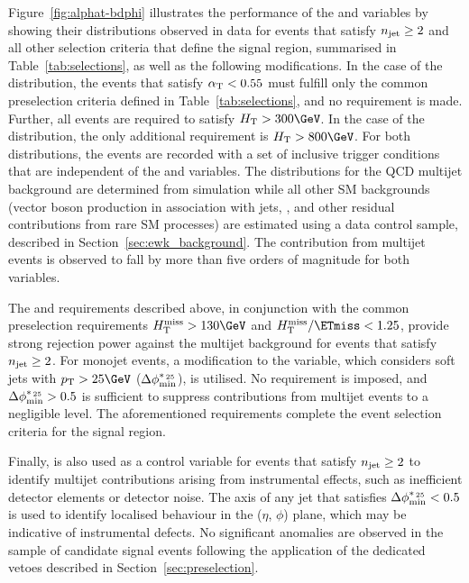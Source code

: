Figure~\ref{fig:alphat-bdphi} illustrates the performance of the
\alphat and \bdphi variables by showing their distributions observed
in data for events that satisfy $n_{\text{jet}} \geq 2$ and all other selection
criteria that define the signal region, summarised in
Table~\ref{tab:selections}, as well as the following modifications.
In the case of the \alphat distribution, the events that satisfy
$\alpha_{\text{T}} < 0.55$ must fulfill only the common preselection criteria
defined in Table~\ref{tab:selections}, and no \HTmiss requirement is
made. Further, all events are required to satisfy $\scalht >
300\GeV$. In the case of the \bdphi distribution, the only additional
requirement is $\scalht > 800\GeV$. For both distributions, the events
are recorded with a set of inclusive trigger conditions that are
independent of the \alphat and \bdphi variables. The distributions for
the QCD multijet background are determined from simulation while all
other SM backgrounds (vector boson production in association with
jets, \ttbar, and other residual contributions from rare SM processes)
are estimated using a \mj data control sample, described in
Section~\ref{sec:ewk_background}. The contribution from multijet
events is observed to fall by more than five orders of magnitude for
both variables.

The \alphat and \bdphi requirements described above, in conjunction
with the common preselection requirements $\HTmiss > 130\GeV$ and
$\HTmiss / \ETmiss < 1.25$, provide strong rejection power against the
multijet background for events that satisfy $n_{\text{jet}} \geq 2$. For
monojet events, a modification to the \bdphi variable, which considers
soft jets with $\Pt > 25\GeV$ ($\mbox{$\Delta\phi^{*_{\, 25}}_{\rm min}$}$), is utilised. No \alphat
requirement is imposed, and $\mbox{$\Delta\phi^{*_{\, 25}}_{\rm min}$} > 0.5$ is sufficient to
suppress contributions from multijet events to a negligible level.
The aforementioned requirements complete the event selection criteria
for the signal region.

Finally, \bdphimod is also used as a control variable for events that
satisfy $n_{\text{jet}} \geq 2$ to identify multijet contributions arising from
instrumental effects, such as inefficient detector elements or
detector noise. The axis of any jet that satisfies $\mbox{$\Delta\phi^{*_{\, 25}}_{\rm min}$} < 0.5$
is used to identify localised behaviour in the ($\eta$, $\phi$) plane,
which may be indicative of instrumental defects. No significant
anomalies are observed in the sample of candidate signal events
following the application of the dedicated vetoes described in
Section~\ref{sec:preselection}.

